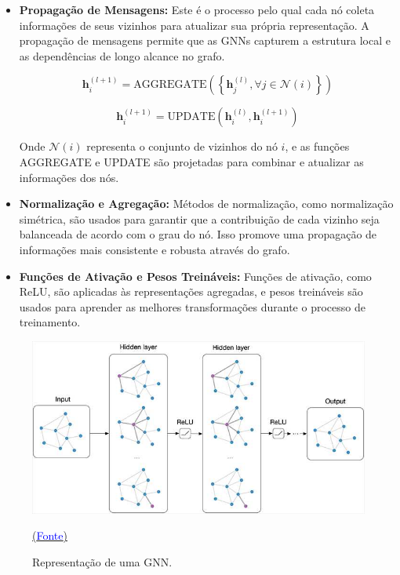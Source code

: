 \begin{itemize}
    \item \textbf{Propagação de Mensagens:} 
    Este é o processo pelo qual cada nó coleta informações de seus vizinhos para atualizar sua própria representação. A propagação de mensagens permite que as GNNs capturem a estrutura local e as dependências de longo alcance no grafo.

    \begin{equation}
    \mathbf{h}_i^{(l+1)} = \text{AGGREGATE} \left(\left\{\mathbf{h}_j^{(l)}, \forall j \in \mathcal{N}(i)\right\}\right)
    \end{equation}

    \begin{equation}
    \mathbf{h}_i^{(l+1)} = \text{UPDATE} \left(\mathbf{h}_i^{(l)}, \mathbf{h}_i^{(l+1)}\right)
    \end{equation}

    Onde \(\mathcal{N}(i)\) representa o conjunto de vizinhos do nó \(i\), e as funções AGGREGATE e UPDATE são projetadas para combinar e atualizar as informações dos nós.

    \item \textbf{Normalização e Agregação:} 
    Métodos de normalização, como normalização simétrica, são usados para garantir que a contribuição de cada vizinho seja balanceada de acordo com o grau do nó. Isso promove uma propagação de informações mais consistente e robusta através do grafo.

    \item \textbf{Funções de Ativação e Pesos Treináveis:} 
    Funções de ativação, como ReLU, são aplicadas às representações agregadas, e pesos treináveis são usados para aprender as melhores transformações durante o processo de treinamento.
\end{itemize}

\clearpage
  \begin{figure}
    \centering
    \includegraphics[width=0.8\linewidth]{image.png}
    \caption{Representação de uma GNN.} \protect\href{https://tkipf.github.io/graph-convolutional-networks/}{(\textcolor{blue}{Fonte})}
    \label{fig:cnn}
\end{figure}



